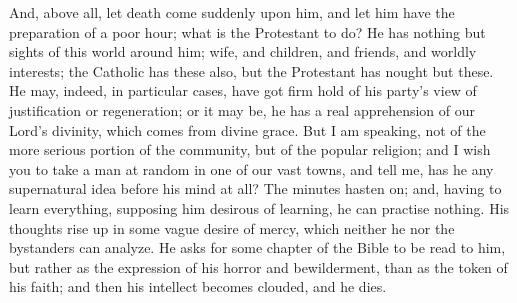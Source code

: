 And, above all, let death come suddenly upon him, and let him have
the preparation of a poor hour; what is the Protestant to do? He has
nothing but sights of this world around him; wife, and children, and
friends, and worldly interests; the Catholic has these also, but the
Protestant has nought but these. He may, indeed, in particular cases,
have got firm hold of his party's view of justification or
regeneration; or it may be, he has a real apprehension of our Lord's
divinity, which comes from divine grace. But I am speaking, not of the
more serious portion of the community, but of the popular religion;
and I wish you to take a man at random in one of our vast towns, and
tell me, has he any supernatural idea before his mind at all? The
minutes hasten on; and, having to learn everything, supposing him
desirous of learning, he can practise nothing. His thoughts rise up in
some vague desire of mercy, which neither he nor the bystanders can
analyze. He asks for some chapter of the Bible to be read to him, but
rather as the expression of his horror and bewilderment, than as the
token of his faith; and then his intellect becomes clouded, and he
dies.

